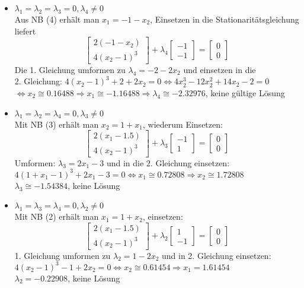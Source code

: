 \documentclass[a4paper, 12pt]{report}
\begin{document}
\begin{itemize}
  \item $\lambda_1 = \lambda_2 = \lambda_3 = 0, \lambda_4 \neq 0$\\
  Aus NB (4) erhält man $x_1 = -1 - x_2$, Einsetzen in die Stationaritätsgleichung liefert
  $$\begin{bmatrix}2(-1-x_2)\\4(x_2-1)^3\end{bmatrix} + \lambda_4 \begin{bmatrix}-1\\-1\end{bmatrix} = \begin{bmatrix}0\\0\end{bmatrix}$$
  Die 1. Gleichung umformen zu $\lambda_4 = -2 - 2x_2$ und einsetzen in die\\
  2. Gleichung: $4(x_2 - 1)^3 + 2 + 2x_2 = 0 \Leftrightarrow 4x_2^3 - 12x_2^2 + 14x_2 - 2 = 0$\\
  $\Leftrightarrow x_2 \cong 0.16488 \Rightarrow x_1 \cong -1.16488 \Rightarrow \lambda_4 \cong -2.32976$, keine gültige Lösung

  \item $\lambda_1 = \lambda_2 = \lambda_4 = 0, \lambda_3 \neq 0$\\
  Mit NB (3) erhält man $x_2 = 1 + x_1$, wiederum Einsetzen:
  $$\begin{bmatrix}2(x_1 - 1.5)\\4(x_2 -1)^3\end{bmatrix} +\lambda_3 \begin{bmatrix}-1\\1\end{bmatrix} = \begin{bmatrix}0\\0\end{bmatrix}$$
  Umformen: $\lambda_3 = 2x_1 - 3$ und in die 2. Gleichung einsetzen:\\
  $4(1 + x_1 - 1)^3 + 2x_1 - 3 = 0 \Leftrightarrow x_1 \cong 0.72808 \Rightarrow x_2 \cong 1.72808$\\
  $\lambda_3 \cong -1.54384$, keine Lösung

  \item $\lambda_1 = \lambda_3 = \lambda_4 = 0, \lambda_2 \neq 0$\\
  Mit NB (2) erhält man $x_1 = 1 + x_2$, einsetzen:
  $$\begin{bmatrix}2(x_1 - 1.5)\\4(x_2 -1)^3\end{bmatrix} + \lambda_2 \begin{bmatrix}1\\-1\end{bmatrix} = \begin{bmatrix}0\\0\end{bmatrix}$$
  1. Gleichung umformen zu $\lambda_2 = 1 - 2x_2$ und in 2. Gleichung einsetzen:\\
  $4(x_2 - 1)^3 -1 + 2x_2 = 0 \Leftrightarrow x_2 \cong 0.61454 \Rightarrow x_1 = 1.61454$\\
  $\lambda_2 = -0.22908$, keine Lösung


\end{itemize}
\end{document}
